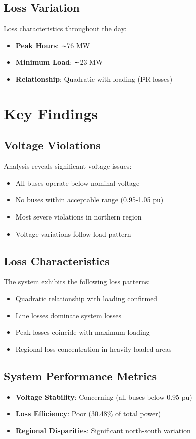 \documentclass[11pt]{article}
\begin{document}
\subsection{Loss Variation}
Loss characteristics throughout the day:
\begin{itemize}
    \item \textbf{Peak Hours}: ∼76 MW
    \item \textbf{Minimum Load}: ∼23 MW
    \item \textbf{Relationship}: Quadratic with loading (I²R losses)
\end{itemize}

\section{Key Findings}

\subsection{Voltage Violations}
Analysis reveals significant voltage issues:
\begin{itemize}
    \item All buses operate below nominal voltage
    \item No buses within acceptable range (0.95-1.05 pu)
    \item Most severe violations in northern region
    \item Voltage variations follow load pattern
\end{itemize}

\subsection{Loss Characteristics}
The system exhibits the following loss patterns:
\begin{itemize}
    \item Quadratic relationship with loading confirmed
    \item Line losses dominate system losses
    \item Peak losses coincide with maximum loading
    \item Regional loss concentration in heavily loaded areas
\end{itemize}

\subsection{System Performance Metrics}
\begin{itemize}
    \item \textbf{Voltage Stability}: Concerning (all buses below 0.95 pu)
    \item \textbf{Loss Efficiency}: Poor (30.48\% of total power)
    \item \textbf{Regional Disparities}: Significant north-south variation
\end{itemize}
\end{document}

